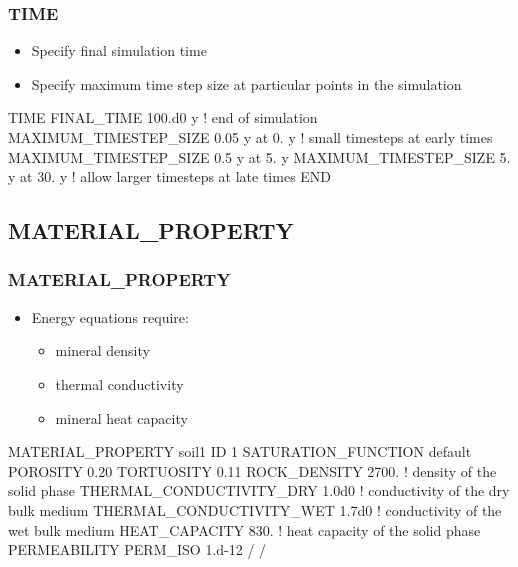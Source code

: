 \documentclass{beamer}
\newcommand\bluecomment[1]{{{\color{blue} #1}}}
\begin{document}
\begin{frame}[fragile]\frametitle{TIME}
\begin{itemize}
  \item Specify final simulation time
  \item Specify maximum time step size at particular points in the simulation
\end{itemize}

\begin{semiverbatim}

TIME
  FINAL_TIME 100.d0 y \bluecomment{! end of simulation}
  MAXIMUM_TIMESTEP_SIZE 0.05 y at 0. y \bluecomment{! small timesteps at early times}
  MAXIMUM_TIMESTEP_SIZE 0.5 y at 5. y
  MAXIMUM_TIMESTEP_SIZE 5. y at 30. y \bluecomment{! allow larger timesteps at late times}
END
\end{semiverbatim}

\end{frame}

\subsection{MATERIAL\_PROPERTY}

\begin{frame}[fragile]\frametitle{MATERIAL\_PROPERTY}
\begin{itemize}
  \item Energy equations require:
  \begin{itemize}
    \item mineral density
    \item thermal conductivity
    \item mineral heat capacity
  \end{itemize}
\end{itemize}

\begin{semiverbatim}

MATERIAL_PROPERTY soil1
  ID 1
  SATURATION_FUNCTION default
  POROSITY 0.20
  TORTUOSITY 0.11
  ROCK_DENSITY 2700. \bluecomment{! density of the solid phase}
  THERMAL_CONDUCTIVITY_DRY 1.0d0 \bluecomment{! conductivity of the dry bulk medium}
  THERMAL_CONDUCTIVITY_WET 1.7d0 \bluecomment{! conductivity of the wet bulk medium}
  HEAT_CAPACITY 830. \bluecomment{! heat capacity of the solid phase}
  PERMEABILITY
    PERM_ISO 1.d-12
  /
/
\end{semiverbatim}

\end{frame}
\end{document}
